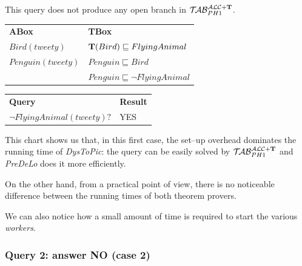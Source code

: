\documentclass[a4paper, 11pt, oneside]{duthesis}
\newcommand{\tip}{{\bf T}}
\newcommand{\primo}{\mathrel{{\mathcal{T}\!\mathcal{AB}}}_{PH 1}^{\mathcal{ALC}+\mbox{\scriptsize $\tip$}}}
\begin{document}
This query does not produce any open branch in $\primo$.\\

\begin{tabular}{ll}
	\textbf{ABox} & \textbf{TBox}\\
	$Bird(tweety)$ & $\tip(Bird) \sqsubseteq FlyingAnimal$\\
	$Penguin(tweety)$ & $Penguin \sqsubseteq Bird$\\
	& $Penguin \sqsubseteq \neg FlyingAnimal$\\[0.5cm]
\end{tabular}

\begin{tabular}{ll}
\textbf{Query} & \textbf{Result}\\
$\neg FlyingAnimal(tweety)?$ & YES\\
\end{tabular}

\begin{figure}[ht]
\begin{bchart}[step=200,max=200,unit=ms,scale=1.4]
    \medskip
    \medskip
    \medskip
    \medskip
\end{bchart}
\caption{}
\end{figure}

This chart shows us that, in this first case, the set--up overhead dominates the running time of \emph{DysToPic}: the query can be easily solved by $\primo$ and \emph{PreDeLo} does it more efficiently.

On the other hand, from a practical point of view, there is no noticeable difference between the running times of both theorem provers.

We can also notice how a small amount of time is required to start the various \emph{workers}.

\newpage

\subsubsection{Query 2: answer NO (case 2)}
\end{document}
